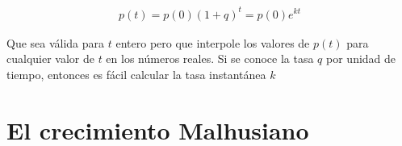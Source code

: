 \begin{align}
    p(t)=p(0)(1+q)^t=p(0)e^{kt}
\end{align}

Que sea válida para $t$ entero pero que interpole los valores de $p(t)$ para cualquier valor de $t$ en los números reales. Si se conoce la tasa $q$ por unidad de tiempo, entonces es fácil calcular la tasa instantánea $k$



\section{El crecimiento Malhusiano}








